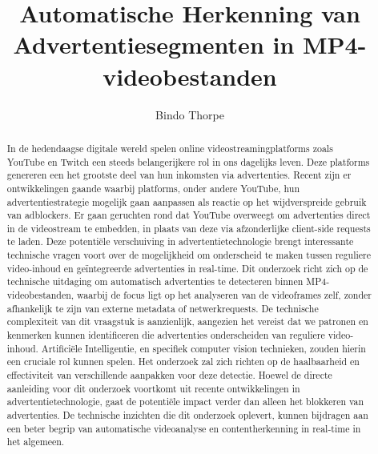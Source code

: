 \documentclass{hogent-article}
\title{Automatische Herkenning van Advertentiesegmenten in MP4-videobestanden}
\author{Bindo Thorpe}
\begin{document}
\begin{abstract}
  In de hedendaagse digitale wereld spelen online videostreamingplatforms zoals YouTube en Twitch een steeds belangerijkere rol in ons dagelijks leven. Deze platforms genereren een het grootste deel van hun inkomsten via advertenties. Recent zijn er ontwikkelingen gaande waarbij platforms, onder andere YouTube, hun advertentiestrategie mogelijk gaan aanpassen als reactie op het wijdverspreide gebruik van adblockers. Er gaan geruchten rond dat YouTube overweegt om advertenties direct in de videostream te embedden, in plaats van deze via afzonderlijke client-side requests te laden. Deze potentiële verschuiving in advertentietechnologie brengt interessante technische vragen voort over de mogelijkheid om onderscheid te maken tussen reguliere video-inhoud en geïntegreerde advertenties in real-time. Dit onderzoek richt zich op de technische uitdaging om automatisch advertenties te detecteren binnen MP4-videobestanden, waarbij de focus ligt op het analyseren van de videoframes zelf, zonder afhankelijk te zijn van externe metadata of netwerkrequests. De technische complexiteit van dit vraagstuk is aanzienlijk, aangezien het vereist dat we patronen en kenmerken kunnen identificeren die advertenties onderscheiden van reguliere video-inhoud. Artificiële Intelligentie, en specifiek computer vision technieken, zouden hierin een cruciale rol kunnen spelen. Het onderzoek zal zich richten op de haalbaarheid en effectiviteit van verschillende aanpakken voor deze detectie. Hoewel de directe aanleiding voor dit onderzoek voortkomt uit recente ontwikkelingen in advertentietechnologie, gaat de potentiële impact verder dan alleen het blokkeren van advertenties. De technische inzichten die dit onderzoek oplevert, kunnen bijdragen aan een beter begrip van automatische videoanalyse en contentherkenning in real-time in het algemeen.
\end{abstract}

\tableofcontents



\printbibliography[heading=bibintoc]
\end{document}

